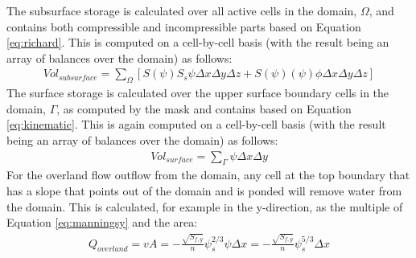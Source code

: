 The subsurface storage is calculated over all active cells in the domain, $\Omega$, and contains both compressible and incompressible parts based on Equation \ref{eq:richard}. This is computed on a cell-by-cell basis (with the result being an array of balances over the domain) as follows:
\begin{eqnarray}
Vol_{subsurface} = \sum_\Omega [ S(\psi)S_s \psi \Delta x \Delta y \Delta z +
S(\psi)(\psi)\phi \Delta x \Delta y \Delta z]
\label{eq:sub_store}
\end{eqnarray}
The surface storage is calculated over the upper surface boundary cells in the domain, $\Gamma$, as computed by the mask and contains based on Equation \ref{eq:kinematic}. This is again computed on a cell-by-cell basis (with the result being an array of balances over the domain) as follows:
\begin{eqnarray}
Vol_{surface} =  \sum_\Gamma \psi \Delta x \Delta y
\label{eq:surf_store}
\end{eqnarray}
For the overland flow outflow from the domain, any cell at the top boundary that has a slope that points out of the domain and is ponded will remove water from the domain.  This is calculated, for example in the y-direction, as the multiple of Equation \ref{eq:manningsy} and the area:
\begin{eqnarray}
Q_{overland}=vA= -\frac{\sqrt{S_{f,y}}}{n}\psi_{s}^{2/3}\psi \Delta x=- \frac{\sqrt{S_{f,y}}}{n}\psi_{s}^{5/3}\Delta x
\label{eq:outflow}
\end{eqnarray}
